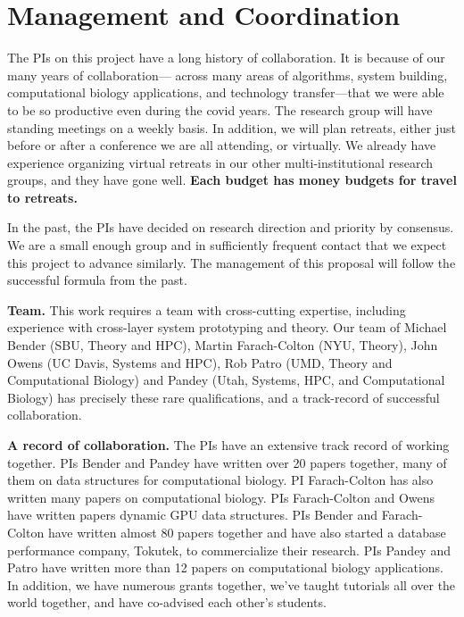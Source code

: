 
\section*{Management and Coordination}


The PIs on this project have a long history of collaboration. It is because of our many years of collaboration— across many areas of algorithms, system building, computational biology applications, and technology transfer—that we were able to be so productive even during the covid years.
%
The research group will have standing meetings on a weekly basis.  In addition, we will plan retreats, either just before or after a conference we are all attending, or virtually.  We already have experience organizing virtual retreats in our other multi-institutional research groups, and they have gone well. {\bf Each budget has money budgets for travel to retreats.}

In the past, the PIs have decided on research direction and priority by consensus. We are a small enough group and in sufficiently frequent contact that we expect this project to advance similarly. The management of this proposal will follow the successful formula from the past.

\noindent
{\bf Team.}
This work requires a team with cross-cutting expertise, including experience with cross-layer system prototyping and theory. Our team of Michael Bender (SBU, Theory and HPC), Martin Farach-Colton (NYU, Theory), John Owens (UC Davis, Systems and HPC), Rob Patro (UMD, Theory and Computational Biology) and Pandey (Utah, Systems, HPC, and Computational Biology) has precisely these rare qualifications, and a track-record of successful collaboration.
%

\noindent
{\bf A record of collaboration.}
The PIs have an extensive track record of working together. PIs Bender and Pandey have written over 20 papers together, many of them on data structures for computational biology.  PI Farach-Colton has also written many papers on computational biology.  PIs Farach-Colton and Owens have written papers dynamic GPU data structures.  PIs Bender and Farach-Colton have written almost 80 papers together and have also started a database performance company, Tokutek, to commercialize their research.  PIs Pandey and Patro have written more than 12 papers on computational biology applications. In addition, we have numerous grants together, we've taught tutorials all over the world together, and have co-advised each other's students. 

